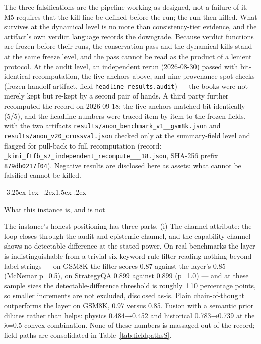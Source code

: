 \documentclass[11pt,a4paper]{article}
\makeatletter
\renewcommand\subsection{\@startsection{subsection}{2}{\z@}%
  {-3.25ex\@plus -1ex \@minus -.2ex}{1.5ex \@plus .2ex}%
  {\normalfont\large\bfseries\raggedright}}
\makeatother
\begin{document}
The three falsifications are the pipeline working as designed, not a failure of it. M5 requires that the kill line be defined before the run; the run then killed. What survives at the dynamical level is no more than consistency-tier evidence, and the artifact's own verdict language records the downgrade. Because verdict functions are frozen before their runs, the conservation pass and the dynamical kills stand at the same freeze level, and the pass cannot be read as the product of a lenient protocol. At the audit level, an independent rerun (2026-08-30) passed with bit-identical recomputation, the five anchors above, and nine provenance spot checks (frozen handoff artifact, field \texttt{headline\_\allowbreak results.audit}) — the books were not merely kept but re-kept by a second pair of hands. A third party further recomputed the record on 2026-09-18: the five anchors matched bit-identically (5/5), and the headline numbers were traced item by item to the frozen fields, with the two artifacts \texttt{results/\allowbreak anon\_\allowbreak benchmark\_\allowbreak v1\_\_\allowbreak gsm8k.json} and \texttt{results/\allowbreak anon\_\allowbreak v20\_\allowbreak crossval.json} checked only at the summary-field level and flagged for pull-back to full recomputation (record: \texttt{\_kimi\_\allowbreak ftfb\_\allowbreak s7\_\allowbreak independent\_\allowbreak recompute\_\_\_\allowbreak 18.json}, SHA-256 prefix \texttt{879db0217f04}). Negative results are disclosed here as assets: what cannot be falsified cannot be killed.

\subsection{What this instance is, and is not}

The instance's honest positioning has three parts. (i) The channel attribute: the loop closes through the audit and epistemic channel, and the capability channel shows no detectable difference at the stated power. On real benchmarks the layer is indistinguishable from a trivial six-keyword rule filter reading nothing beyond label strings — on GSM8K the filter scores 0.87 against the layer's 0.85 (McNemar p=0.5), on StrategyQA 0.899 against 0.899 (p=1.0) — and at these sample sizes the detectable-difference threshold is roughly ±10 percentage points, so smaller increments are not excluded, disclosed as-is. Plain chain-of-thought outperforms the layer on GSM8K, 0.97 versus 0.85. Fusion with a semantic prior dilutes rather than helps: physics 0.484→0.452 and historical 0.783→0.739 at the λ=0.5 convex combination. None of these numbers is massaged out of the record; field paths are consolidated in Table~\ref{tab:fieldpathsS}.
\end{document}
